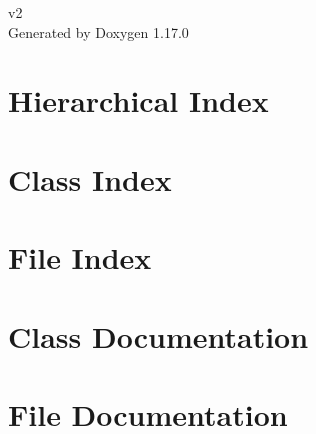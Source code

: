 \documentclass[twoside]{book}
\newcommand{\+}{\discretionary{\mbox{\scriptsize$\hookleftarrow$}}{}{}}
\newcommand{\clearemptydoublepage}{%
    \newpage{\pagestyle{empty}\cleardoublepage}%
  }
\begin{document}
  \raggedbottom
    \hypersetup{pageanchor=false,
                bookmarksnumbered=true,
                pdfencoding=unicode
               }
  \begin{titlepage}
  \vspace*{7cm}
  \begin{center}%
  {\Large v2}\\
  \vspace*{1cm}
  {\large Generated by Doxygen 1.17.0}\\
  \end{center}
  \end{titlepage}
  \clearemptydoublepage
  \tableofcontents
  \clearemptydoublepage
  \hypersetup{pageanchor=true}
\chapter{Hierarchical Index}

\chapter{Class Index}

\chapter{File Index}

\chapter{Class Documentation}


\chapter{File Documentation}


  \backmatter
  \newpage
  \clearemptydoublepage
  \printindex
\end{document}

